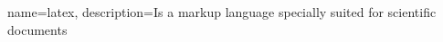 {
    name={latex},
    description={Is a markup language specially suited 
    for scientific documents}
}